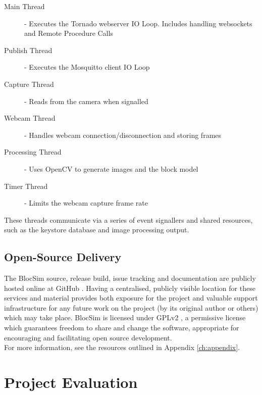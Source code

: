 \begin{description}
	\item[Main Thread] - Executes the Tornado webserver IO Loop. Includes handling websockets and Remote Procedure Calls
	\item[Publish Thread] - Executes the Mosquitto client IO Loop
	\item[Capture Thread] - Reads from the camera when signalled
	\item[Webcam Thread] - Handles webcam connection/disconnection and storing frames
	\item[Processing Thread] - Uses OpenCV to generate images and the block model
	\item[Timer Thread] - Limits the webcam capture frame rate
\end{description}

These threads communicate via a series of event signallers and shared resources, such as the keystore database and image processing output.




\section{Open-Source Delivery}

The BlocSim source, release build, issue tracking and documentation are publicly hosted online at GitHub \cite{blocsim}\cite{github}. Having a centralised, publicly visible location for these services and material provides both exposure for the project and valuable support infrastructure for any future work on the project (by its original author or others) which may take place. BlocSim is licensed under GPLv2 \cite{gplv2}, a permissive license which guarantees freedom to share and change the software, appropriate for encouraging and facilitating open source development.
\\

For more information, see the resources outlined in Appendix \ref{ch:appendix}.




\chapter{Project Evaluation}



